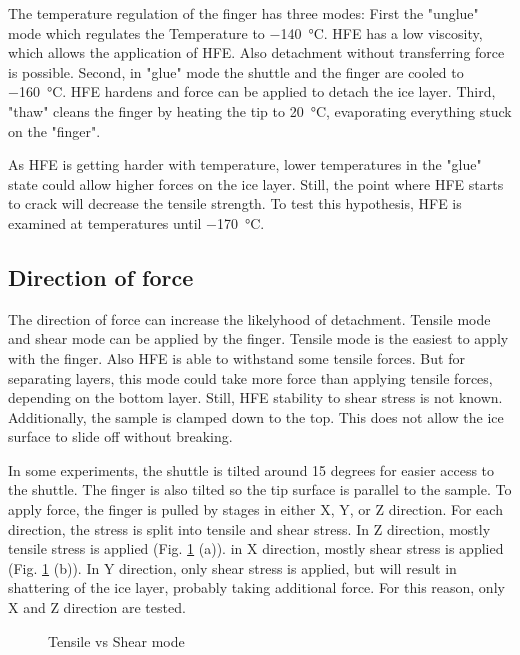 The temperature regulation of the finger has three modes: First the "unglue" mode which regulates the Temperature to \SI{-140}{\degreeCelsius}. HFE has a low viscosity, which allows the application of HFE. Also detachment without transferring force is possible. Second, in "glue" mode the shuttle and the finger are cooled to \SI{-160}{\degreeCelsius}. HFE hardens and force can be applied to detach the ice layer. Third, "thaw" cleans the finger by heating the tip to \SI{20}{\degreeCelsius}, evaporating everything stuck on the "finger". 

As HFE is getting harder with temperature, lower temperatures in the "glue" state could allow higher forces on the ice layer. Still, the point where HFE starts to crack will decrease the tensile strength. To test this hypothesis, HFE is examined at temperatures until \SI{-170}{\degreeCelsius}.

\subsection{Direction of force}

The direction of force can increase the likelyhood of detachment. Tensile mode and shear mode can be applied by the finger. Tensile mode is the easiest to apply with the finger. Also HFE is able to withstand some tensile forces. But for separating layers, this mode could take more force than applying tensile forces, depending on the bottom layer. Still, HFE stability to shear stress is not known. Additionally, the sample is clamped down to the top. This does not allow the ice surface to slide off without breaking.

In some experiments, the shuttle is tilted around 15 degrees for easier access to the shuttle. The finger is also tilted so the tip surface is parallel to the sample. To apply force, the finger is pulled by stages in either X, Y, or Z direction. For each direction, the stress is split into tensile and shear stress. In Z direction, mostly tensile stress is applied (Fig. \ref{fig:tensilevsshear} (a)). in X direction, mostly shear stress is applied (Fig. \ref{fig:tensilevsshear} (b)). In Y direction, only shear stress is applied, but will result in shattering of the ice layer, probably taking additional force. For this reason, only X and Z direction are tested.

\begin{figure}[hbt!]
	\centering
	
	\caption{Tensile vs Shear mode}
	\label{fig:tensilevsshear}
\end{figure}

